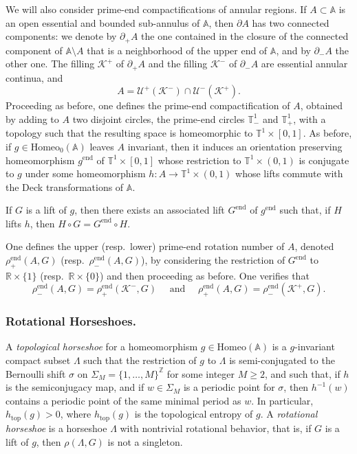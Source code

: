 \documentclass[12pt,a4paper]{amsart}
\theoremstyle{definition}
\theoremstyle{remark}
\newcommand{\T}{\mathbb{T}}
\newcommand{\R}{\mathbb{R}}
\newcommand{\Z}{\mathbb{Z}}
\newcommand{\A}{\mathbb{A}}
\begin{document}
We will also consider prime-end compactifications of annular regions. If $A\subset \A$ is an open essential and bounded sub-annulus of $\A$, then $\partial A$ has two connected components: we denote by $\partial_{+} A$ the one contained in the closure of the connected component of $\A\setminus A$ that is a neighborhood of the upper end of $\A$, and by $\partial_{-} A$ the other one. The filling $\mathcal{K}^{+}$ of $\partial_{+} A$ and the filling $\mathcal{K}^{-}$ of $\partial_{-} A$ are essential annular continua, and
$$A=\mathcal{U}^{+}(\mathcal{K}^{-})\cap\mathcal{U}^{-}(\mathcal{K}^{+}).$$
Proceeding as before, one defines the prime-end compactification of $A$, obtained by adding to $A$ two disjoint circles, the prime-end circles $\T^1_{-}$ and $\T^{1}_+$, with a topology such that the resulting space is homeomorphic to $\T^1\times[0,1]$. As before, if $g\in\mathrm{Homeo}_0(\A)$ leaves $A$ invariant, then it induces an orientation preserving homeomorphism $g^{\mathrm{end}}$ of $\T^1\times [0,1]$ whose restriction to $\T^1\times (0,1)$ is conjugate to $g$ under some homeomorphism $h:A\to \T^1\times (0,1)$ whose lifts commute with the Deck transformations of $\A$.
 
If $G$ is a lift of $g$, then there exists an associated lift $G^{\mathrm{end}}$ of $g^{\mathrm{end}}$ such that, if $H$ lifts $h$, then $H\circ G=G^{\mathrm{end}}\circ H$.
 
One defines the upper (resp.\ lower) prime-end rotation number of $A$, denoted $\rho^{\mathrm{end}}_+(A, G)$ (resp.\ $\rho^{\mathrm{end}}_{-}(A,G)$), by considering the restriction of $G^{\mathrm{end}}$ to $\R\times\{1\}$ (resp.\ $\R\times\{0\}$) and then proceeding as before. One verifies that
$$\rho^{\mathrm{end}}_{-}(A,G)=\rho^{\mathrm{end}}_{+}(\mathcal{K}^{-},G)\quad\mbox{ and }\quad\rho^{\mathrm{end}}_{+}(A,G)=\rho^{\mathrm{end}}_{-}(\mathcal{K}^{+},G).$$



\subsubsection{Rotational Horseshoes.}

A \emph{topological horseshoe} for a homeomorphism $g\in\mathrm{Homeo}(\A)$ is a $g$-invariant compact subset $\Lambda$ such that the restriction of $g$ to $\Lambda$ is semi-conjugated to the Bernoulli shift $\sigma$ on $\Sigma_M=\{1,\hdots, M\}^{\Z}$ for some integer $M\ge 2$, and such that, if $h$ is the semiconjugacy map, and if $w\in\Sigma_M$ is a periodic point for $\sigma$, then $h^{-1}(w)$ contains a periodic point of the same minimal period as $w$. In particular, $h_{\mathrm{top}}(g)>0$, where $h_{\mathrm{top}}(g)$ is the topological entropy of $g$. A \emph{rotational horseshoe} is a horseshoe $\Lambda$ with nontrivial rotational behavior, that is,  if $G$ is a lift of $g$, then $\rho(\Lambda, G)$ is not a singleton. 
\end{document}
